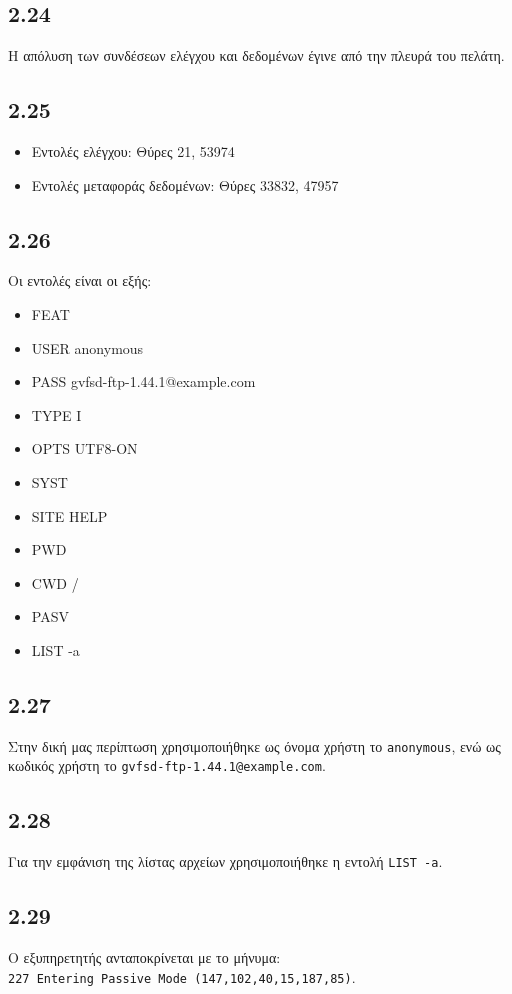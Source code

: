 		\subsection*{2.24}
			Η απόλυση των συνδέσεων ελέγχου και δεδομένων έγινε από την πλευρά του πελάτη.
		
		\subsection*{2.25}
			\begin{itemize}
				\item Εντολές ελέγχου: Θύρες 21, 53974
				\item Εντολές μεταφοράς δεδομένων: Θύρες 33832, 47957
			\end{itemize}
		
		\subsection*{2.26}
			Οι εντολές είναι οι εξής:
			
			\begin{itemize}
				\item FEAT
				\item USER anonymous
				\item PASS gvfsd-ftp-1.44.1@example.com
				\item TYPE I
				\item OPTS UTF8-ON
				\item SYST
				\item SITE HELP
				\item PWD
				\item CWD /
				\item PASV
				\item LIST -a
			\end{itemize}
		
		\subsection*{2.27}
			Στην δική μας περίπτωση χρησιμοποιήθηκε ως όνομα χρήστη το \verb|anonymous|, ενώ ως κωδικός χρήστη το \verb|gvfsd-ftp-1.44.1@example.com|.
		
		\subsection*{2.28}
			Για την εμφάνιση της λίστας αρχείων χρησιμοποιήθηκε η εντολή \verb|LIST -a|.
		
		\subsection*{2.29}
			Ο εξυπηρετητής ανταποκρίνεται με το μήνυμα: \\
			\verb|227 Entering Passive Mode (147,102,40,15,187,85)|.
		

